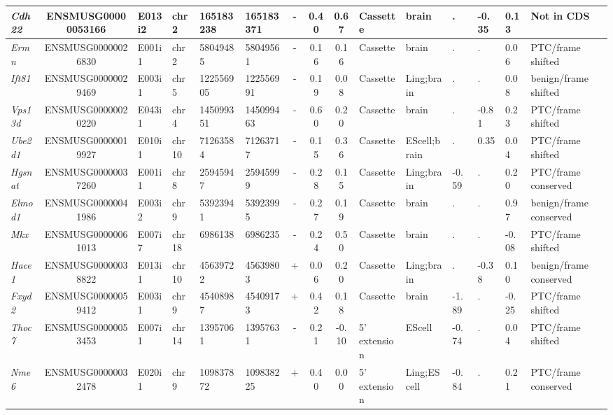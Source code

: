 \begin{appendices}
\begin{landscape}
\begin{table}[htbp]
{\begin{tabular}{|l|c|l|l|l|l|c|c|c|l|l|l|l|l|l|}
		\textit{Cdh22} & ENSMUSG00000053166 & E013i2 & chr2  & 165183238 & 165183371 & -     & 0.40  & 0.67  & Cassette & brain & .     & -0.35 & 0.13  & Not in CDS \\ \hline
		\textit{Ermn} & ENSMUSG00000026830 & E001i1 & chr2  & 58049485 & 58049561 & -     & 0.16  & 0.16  & Cassette & brain & .     & .     & 0.06  & PTC/frame shifted \\ \hline
		\textit{Ift81} & ENSMUSG00000029469 & E003i1 & chr5  & 122556905 & 122556991 & -     & 0.19  & 0.08  & Cassette & Ling;brain & .     & .     & 0.08  & benign/frame shifted \\ \hline
		\textit{Vps13d} & ENSMUSG00000020220 & E043i1 & chr4  & 145099351 & 145099463 & -     & 0.60  & 0.20  & Cassette & brain & .     & -0.81 & 0.23  & PTC/frame shifted \\ \hline
		\textit{Ube2d1} & ENSMUSG00000019927 & E010i1 & chr10 & 71263584 & 71263717 & -     & 0.15  & 0.36  & Cassette & EScell;brain & .     & 0.35  & 0.04  & PTC/frame shifted \\ \hline
		\textit{Hgsnat} & ENSMUSG00000037260 & E001i1 & chr8  & 25945947 & 25945999 & -     & 0.28  & 0.15  & Cassette & Ling;brain & -0.59 & .     & 0.20  & PTC/frame conserved \\ \hline
		\textit{Elmod1} & ENSMUSG00000041986 & E003i2 & chr9  & 53923941 & 53923995 & -     & 0.27  & 0.19  & Cassette & brain & .     & .     & 0.97  & benign/frame conserved \\ \hline
		\textit{Mkx} & ENSMUSG00000061013 & E007i7 & chr18 & 6986138 & 6986235 & -     & 0.24  & 0.50  & Cassette & brain & .     & .     & -0.08 & PTC/frame shifted \\ \hline
		\textit{Hace1} & ENSMUSG00000038822 & E013i1 & chr10 & 45639722 & 45639803 & +     & 0.06  & 0.20  & Cassette & Ling;brain & .     & -0.38 & 0.10  & benign/frame conserved \\ \hline
		\textit{Fxyd2} & ENSMUSG00000059412 & E003i1 & chr9  & 45408987 & 45409173 & +     & 0.42  & 0.18  & Cassette & brain & -1.89 & .     & -0.25 & PTC/frame shifted \\ \hline
		\textit{Thoc7} & ENSMUSG00000053453 & E007i1 & chr14 & 13957061 & 13957631 & -     & 0.21  & -0.10 & 5' extension & EScell & -0.74 & .     & 0.04  & PTC/frame shifted \\ \hline
		\textit{Nme6} & ENSMUSG00000032478 & E020i1 & chr9  & 109837872 & 109838225 & +     & 0.40  & 0.00  & 5' extension & Ling;EScell & -0.84 & .     & 0.21  & PTC/frame conserved \\ \hline

\end{tabular}}
\end{table}
\end{landscape}
\end{appendices}
